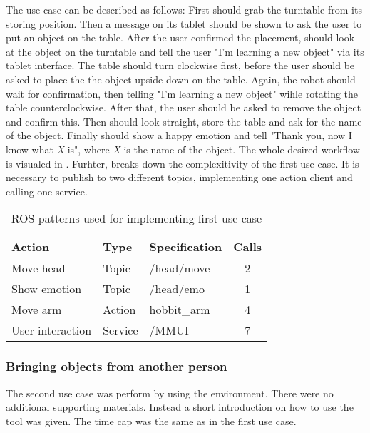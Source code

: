 The use case can be described as follows: First \hobbit{} should grab the turntable from its storing position. Then a message on its tablet should be shown to ask the user to put an object on the table. After the user confirmed the placement, \hobbit{} should look at the object on the turntable and tell the user "I'm learning a new object" via its tablet interface. The table should turn clockwise first, before the user should be asked to place the the object upside down on the table. Again, the robot should wait for confirmation, then telling "I'm learning a new object" wihle rotating the table counterclockwise. After that, the user should be asked to remove the object and confirm this. Then \hobbit{} should look straight, store the table and ask for the name of the object. Finally \hobbit{} should show a happy emotion and tell "Thank you, now I know what \textit{X} is", where \textit{X} is the name of the object. The whole desired workflow is visualed in . Furhter,  breaks down the complexitivity of the first use case. It is necessary to publish to two different topics, implementing one action client and calling one service.

\begin{table}
    \centering
    \begin{tabular}{l l l c}
        \toprule
        Action           & Type    & Specification & Calls \\
        \midrule
        Move head        & Topic   & /head/move    & 2     \\
        Show emotion     & Topic   & /head/emo     & 1     \\
        Move arm         & Action  & hobbit\_arm   & 4     \\
        User interaction & Service & /MMUI         & 7     \\
        \bottomrule
    \end{tabular}
    \caption{ROS patterns used for implementing first use case}
    \label{tab:FirstUseCaseSpecs}
\end{table}

\subsubsection*{Bringing objects from another person}
The second use case was perform by using the \toolname{} environment. There were no additional supporting materials. Instead a short introduction on how to use the tool was given. The time cap was the same as in the first use case. \\

